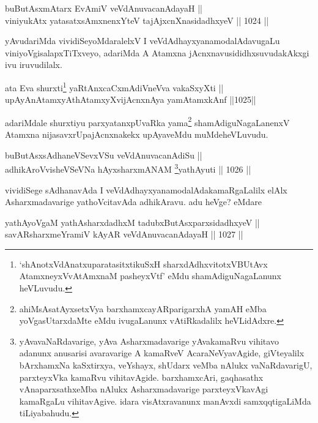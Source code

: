 \begin{shl}
buButAsxmAtarx EvAmiV veVdAnuvacanAdayaH || \\
viniyukAtx yatasatxsAmxnenxYteV tajAjxcnXnasidadhxyeV \hfill || 1024 ||  
\end{shl}

\begin{artha}
yAvudariMda vividiSeyoMdaralelxV I veVdAdhayxyana\break modalAdavugaLu viniyoVgisalapxTiTxveyo, adariMda A Atamxna jAcnxnavusididhxsuvudakAkxgi ivu iruvudilalx.
\end{artha}


\begin{shl}
ata Eva shurxti\footnote{`shAnotxVdAnatxuparatasitxtikuSxH sharxdAdhxvitotxVBUtAvx AtamxneyxVvA\s \s tAmxnaM pasheyxVtf' eMdu shamAdiguNagaLanunx heVLuvudu.} yaRtAnxcaCxmAdiVneVva vakaSxyXti || \\
upAyAnAtamxyAthAtamxyXvijAcnxnAya yamAtamxkAnf \hfill ||1025||  
\end{shl}

\begin{artha}
adariMdale shurxtiyu parxyatanxpUvaRka yama\footnote{ahiMsAsatAyxsetxVya barxhamxcayAR\s parigarxhA yamAH eMba yoVgasUtarxdaMte eMdu ivugaLanunx vAtiRkadalilx heVLidAdxre.} shamAdiguNagaLanenxV Atamxna nijasavxrUpajAcnxnakekx upAyaveMdu muMde\break heVLuvudu.
\end{artha}


\begin{shl}
buButAsxsAdhaneVSevxVSu veVdAnuvacanAdiSu || \\
adhikAroV\s visheVSeVNa hAyxsharxmANAM \footnote{yAvavaNaRdavarige, yAva Asharxmadavarige yAvakamaRvu vihitavo adanunx anusarisi avaravarige A kamaRveV AcaraNeVyavAgide, giVteyalilx bArxhamxNa kaSxtirxya, veYshayx, shUdarx veMba nAlukx vaNaRdavarigU, parxteyxVka kamaRvu vihitavAgide. barxhamxcAri, gaqhasathx vAnaparxsathx\ndash eMba nAlukx Asharxmadavarige parxteyxVkavAgi kamaRgaLu vihitavAgive. idara visAtxravanunx manAvxdi samxqqtigaLiMda tiLiyabahudu.}yathAyuti \hfill || 1026 ||  
\end{shl}


\begin{artha}
vividiSege sAdhanavAda I veVdAdhayxyanamodalAdakamaRgaLalilx elAlx Asharxmadavarige yathoVcitavAda adhikAravu. adu heVge? eMdare
\end{artha}

\begin{shl}
yathAyoVgaM yathAsharxdadhxM tadubxButAsxparxsidadhxyeV || \\
savARsharxmeYramiV kAyAR veVdAnuvacanAdayaH \hfill || 1027 ||  
\end{shl}

